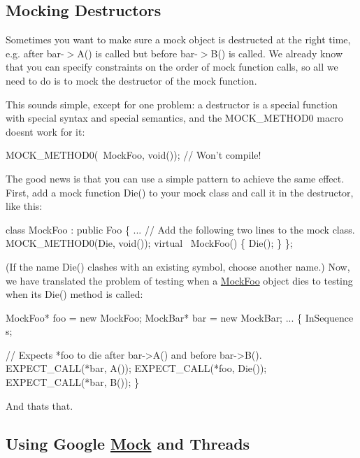 \subsection*{Mocking Destructors}

Sometimes you want to make sure a mock object is destructed at the right time, e.\+g. after {\ttfamily bar-\/$>$A()} is called but before {\ttfamily bar-\/$>$B()} is called. We already know that you can specify constraints on the order of mock function calls, so all we need to do is to mock the destructor of the mock function.

This sounds simple, except for one problem\+: a destructor is a special function with special syntax and special semantics, and the {\ttfamily M\+O\+C\+K\+\_\+\+M\+E\+T\+H\+O\+D0} macro doesn\textquotesingle{}t work for it\+:


\begin{DoxyCode}
MOCK\_METHOD0(~MockFoo, void());  // Won't compile!
\end{DoxyCode}


The good news is that you can use a simple pattern to achieve the same effect. First, add a mock function {\ttfamily Die()} to your mock class and call it in the destructor, like this\+:


\begin{DoxyCode}
class MockFoo : public Foo \{
  ...
  // Add the following two lines to the mock class.
  MOCK\_METHOD0(Die, void());
  virtual ~MockFoo() \{ Die(); \}
\};
\end{DoxyCode}


(If the name {\ttfamily Die()} clashes with an existing symbol, choose another name.) Now, we have translated the problem of testing when a {\ttfamily \hyperlink{class_mock_foo}{Mock\+Foo}} object dies to testing when its {\ttfamily Die()} method is called\+:


\begin{DoxyCode}
MockFoo* foo = new MockFoo;
MockBar* bar = new MockBar;
...
\{
  InSequence s;

  // Expects *foo to die after bar->A() and before bar->B().
  EXPECT\_CALL(*bar, A());
  EXPECT\_CALL(*foo, Die());
  EXPECT\_CALL(*bar, B());
\}
\end{DoxyCode}


And that\textquotesingle{}s that.

\subsection*{Using Google \hyperlink{class_mock}{Mock} and Threads}

